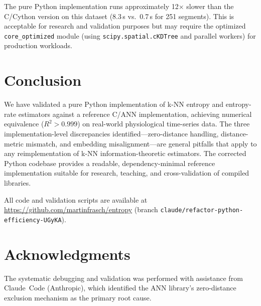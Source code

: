 \documentclass[12pt,a4paper]{article}
\begin{document}
The pure Python implementation runs approximately 12$\times$ slower than the C/Cython version on this dataset (8.3\,s vs.\ 0.7\,s for 251 segments).
This is acceptable for research and validation purposes but may require the optimized \texttt{core\_optimized} module (using \texttt{scipy.spatial.cKDTree} and parallel workers) for production workloads.


\section{Conclusion}\label{sec:conclusion}

We have validated a pure Python implementation of k-NN entropy and entropy-rate estimators against a reference C/ANN implementation, achieving numerical equivalence ($R^2 > 0.999$) on real-world physiological time-series data.
The three implementation-level discrepancies identified---zero-distance handling, distance-metric mismatch, and embedding misalignment---are general pitfalls that apply to any reimplementation of k-NN information-theoretic estimators.
The corrected Python codebase provides a readable, dependency-minimal reference implementation suitable for research, teaching, and cross-validation of compiled libraries.

All code and validation scripts are available at \url{https://github.com/martinfrasch/entropy} (branch \texttt{claude/refactor-python-efficiency-UGyKA}).


\section*{Acknowledgments}

The systematic debugging and validation was performed with assistance from Claude~Code (Anthropic), which identified the ANN library's zero-distance exclusion mechanism as the primary root cause.




\end{document}
